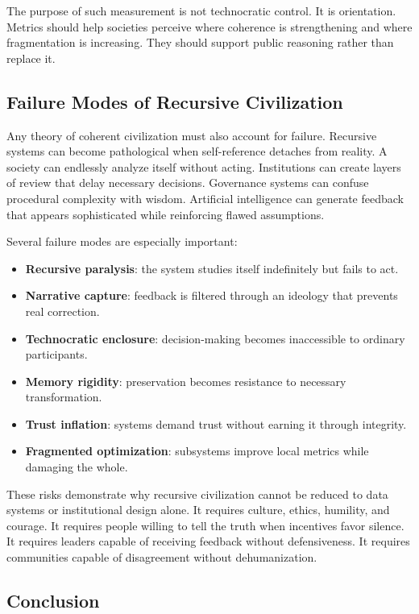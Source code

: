 \documentclass[12pt]{article}
\begin{document}
The purpose of such measurement is not technocratic control. It is orientation. Metrics should help societies perceive where coherence is strengthening and where fragmentation is increasing. They should support public reasoning rather than replace it.

\subsection{Failure Modes of Recursive Civilization}

Any theory of coherent civilization must also account for failure. Recursive systems can become pathological when self-reference detaches from reality. A society can endlessly analyze itself without acting. Institutions can create layers of review that delay necessary decisions. Governance systems can confuse procedural complexity with wisdom. Artificial intelligence can generate feedback that appears sophisticated while reinforcing flawed assumptions.

Several failure modes are especially important:

\begin{itemize}
  \item \textbf{Recursive paralysis}: the system studies itself indefinitely but fails to act.
  \item \textbf{Narrative capture}: feedback is filtered through an ideology that prevents real correction.
  \item \textbf{Technocratic enclosure}: decision-making becomes inaccessible to ordinary participants.
  \item \textbf{Memory rigidity}: preservation becomes resistance to necessary transformation.
  \item \textbf{Trust inflation}: systems demand trust without earning it through integrity.
  \item \textbf{Fragmented optimization}: subsystems improve local metrics while damaging the whole.
\end{itemize}

These risks demonstrate why recursive civilization cannot be reduced to data systems or institutional design alone. It requires culture, ethics, humility, and courage. It requires people willing to tell the truth when incentives favor silence. It requires leaders capable of receiving feedback without defensiveness. It requires communities capable of disagreement without dehumanization.

\subsection{Conclusion}
\end{document}
